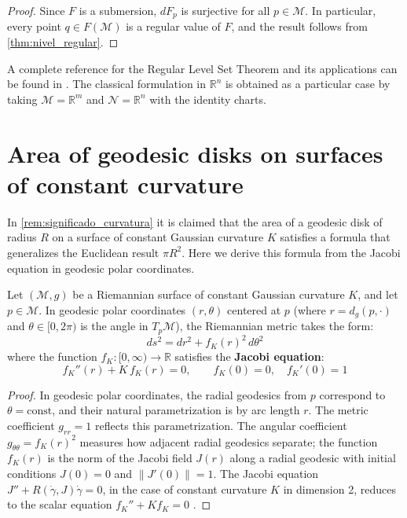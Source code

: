 \begin{proof}
Since $F$ is a submersion, $dF_p$ is surjective for all $p \in \mathcal{M}$. In particular, every point $q \in F(\mathcal{M})$ is a regular value of $F$, and the result follows from \autoref{thm:nivel_regular}.
\end{proof}

\begin{remark}
A complete reference for the Regular Level Set Theorem and its applications can be found in \citet[Chapter~5, Theorem~5.12]{lee2012introduction}. The classical formulation in $\mathbb{R}^n$ is obtained as a particular case by taking $\mathcal{M} = \mathbb{R}^m$ and $\mathcal{N} = \mathbb{R}^n$ with the identity charts.
\end{remark}

\section{Area of geodesic disks on surfaces of constant curvature}\label{sec:area_disco_geodesico}

In \autoref{rem:significado_curvatura} it is claimed that the area of a geodesic disk of radius $R$ on a surface of constant Gaussian curvature $K$ satisfies a formula that generalizes the Euclidean result $\pi R^2$. Here we derive this formula from the Jacobi equation in geodesic polar coordinates.

\begin{proposition}\label{prop:metrica_polar_geodesica}
Let $(\mathcal{M}, g)$ be a Riemannian surface of constant Gaussian curvature $K$, and let $p \in \mathcal{M}$. In geodesic polar coordinates $(r, \theta)$ centered at $p$ (where $r = d_g(p, \cdot)$ and $\theta \in [0, 2\pi)$ is the angle in $T_p\mathcal{M}$), the Riemannian metric takes the form:
\begin{equation}\label{eq:metrica_polar_geodesica}
ds^2 = dr^2 + f_K(r)^2 \, d\theta^2
\end{equation}
where the function $f_K: [0, \infty) \to \mathbb{R}$ satisfies the \textbf{Jacobi equation}:
\begin{equation}\label{eq:jacobi_radial}
f_K''(r) + K \, f_K(r) = 0, \qquad f_K(0) = 0, \quad f_K'(0) = 1
\end{equation}
\end{proposition}

\begin{proof}
In geodesic polar coordinates, the radial geodesics from $p$ correspond to $\theta = \text{const}$, and their natural parametrization is by arc length $r$. The metric coefficient $g_{rr} = 1$ reflects this parametrization. The angular coefficient $g_{\theta\theta} = f_K(r)^2$ measures how adjacent radial geodesics separate; the function $f_K(r)$ is the norm of the Jacobi field $J(r)$ along a radial geodesic with initial conditions $J(0) = 0$ and $\|J'(0)\| = 1$. The Jacobi equation $J'' + R(\dot{\gamma}, J)\dot{\gamma} = 0$, in the case of constant curvature $K$ in dimension 2, reduces to the scalar equation $f_K'' + K f_K = 0$ \citep[Chapter~10]{lee2018introduction}.
\end{proof}


